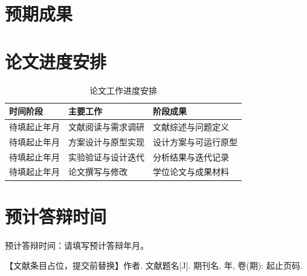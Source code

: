 \documentclass[UTF8,fontset=fandol,zihao=-4,oneside,openany]{ctexbook}
\newcommand{\ExpectedDefenseDate}{请填写预计答辩年月}
\newif\ifShowHints
\newcommand{\hint}[1]{\ifShowHints{\color{black!55}#1}\par\fi}
\begin{document}
\section{预期成果}
\hint{【说明预期达到的水平和成果形式，如论文、交互原型、软件系统或设计作品，并给出完成或验收依据。】}

\section{论文进度安排}
\hint{【将表中的占位内容替换为具体年月和可检查的阶段成果。表题在表格上方，图题在图片下方；三线表与编号已设置。】}
\begin{table}[htbp]
  \caption{论文工作进度安排}
  \label{tab:schedule}
  \centering
  \fontsize{11bp}{14bp}\selectfont
  \renewcommand{\arraystretch}{1.45}
  \begin{tabularx}{\linewidth}{@{}p{24mm}XY@{}}
    \toprule
    时间阶段 & 主要工作 & 阶段成果 \\
    \midrule
    待填起止年月 & 文献阅读与需求调研 & 文献综述与问题定义 \\
    待填起止年月 & 方案设计与原型实现 & 设计方案与可运行原型 \\
    待填起止年月 & 实验验证与设计迭代 & 分析结果与迭代记录 \\
    待填起止年月 & 论文撰写与修改 & 学位论文与成果材料 \\
    \bottomrule
  \end{tabularx}
\end{table}

\section{预计答辩时间}
预计答辩时间：\ExpectedDefenseDate。

\begin{thebibliography}{99}
  \fontsize{10.5bp}{16bp}\selectfont
  \setlength{\itemsep}{3bp}
  \setlength{\parskip}{0pt}
  【文献条目占位，提交前替换】作者. 文献题名[J]. 期刊名, 年, 卷(期): 起止页码.
\end{thebibliography}
\end{document}
